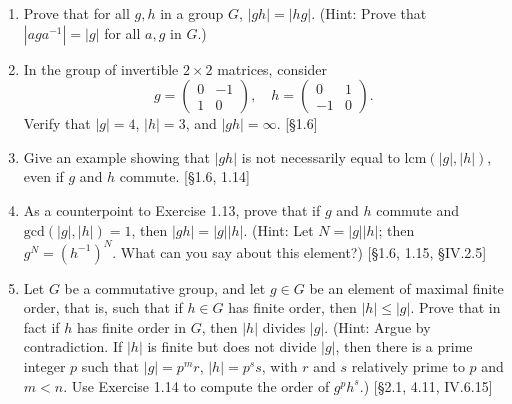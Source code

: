 \begin{enumerate}
    \item Prove that for all $g, h$ in a group $G$, $|gh| = |hg|$. (Hint: Prove that $|aga^{-1}| = |g|$ for all $a, g$ in $G$.)

    \item In the group of invertible $2 \times 2$ matrices, consider
          \[
              g = \begin{pmatrix} 0 & -1 \\ 1 & 0 \end{pmatrix}, \quad h = \begin{pmatrix} 0 & 1 \\ -1 & 0 \end{pmatrix}.
          \]
          Verify that $|g|=4$, $|h|=3$, and $|gh|=\infty$. [\S1.6]

    \item Give an example showing that $|gh|$ is not necessarily equal to $\text{lcm}(|g|,|h|)$, even if $g$ and $h$ commute. [\S1.6, 1.14]

    \item As a counterpoint to Exercise 1.13, prove that if $g$ and $h$ commute and $\text{gcd}(|g|, |h|) = 1$, then $|gh| = |g||h|$. (Hint: Let $N = |g||h|$; then $g^N = (h^{-1})^N$. What can you say about this element?) [\S1.6, 1.15, \S IV.2.5]

    \item Let $G$ be a commutative group, and let $g \in G$ be an element of maximal finite order, that is, such that if $h \in G$ has finite order, then $|h| \le |g|$. Prove that in fact if $h$ has finite order in $G$, then $|h|$ divides $|g|$. (Hint: Argue by contradiction. If $|h|$ is finite but does not divide $|g|$, then there is a prime integer $p$ such that $|g| = p^m r$, $|h| = p^s s$, with $r$ and $s$ relatively prime to $p$ and $m < n$. Use Exercise 1.14 to compute the order of $g^p h^s$.) [\S2.1, 4.11, IV.6.15]
\end{enumerate}